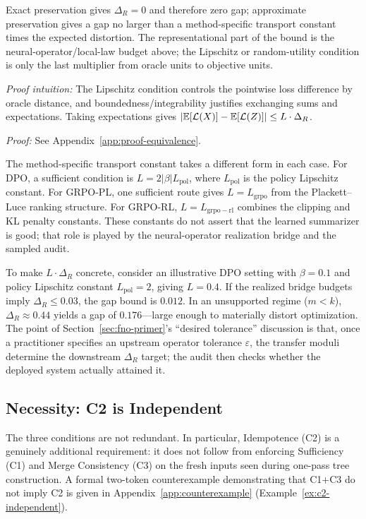 \noindent Exact preservation gives $\Delta_R = 0$ and therefore zero gap; approximate preservation gives a gap no larger than a method-specific transport constant times the expected distortion. The representational part of the bound is the neural-operator/local-law budget above; the Lipschitz or random-utility condition is only the last multiplier from oracle units to objective units.

\noindent\textit{Proof intuition:} The Lipschitz condition controls the pointwise loss difference by oracle distance, and boundedness/integrability justifies exchanging sums and expectations. Taking expectations gives $|\mathbb{E}[\mathcal{L}(X)] - \mathbb{E}[\mathcal{L}(Z)]| \le L \cdot \Delta_R$.

\noindent\textit{Proof:} See Appendix~\ref{app:proof-equivalence}.

The method-specific transport constant takes a different form in each case. For DPO, a sufficient condition is $L = 2|\beta| L_{\mathrm{pol}}$, where $L_{\mathrm{pol}}$ is the policy Lipschitz constant. For GRPO-PL, one sufficient route gives $L = L_{\mathrm{grpo}}$ from the Plackett--Luce ranking structure. For GRPO-RL, $L = L_{\mathrm{grpo-rl}}$ combines the clipping and KL penalty constants. These constants do not assert that the learned summarizer is good; that role is played by the neural-operator realization bridge and the sampled audit.

To make $L \cdot \Delta_R$ concrete, consider an illustrative DPO
setting with $\beta = 0.1$ and policy Lipschitz constant
$L_{\mathrm{pol}} = 2$, giving $L = 0.4$. If the realized bridge
budgets imply $\Delta_R \le 0.03$, the gap bound is $0.012$. In an
unsupported regime ($m < k$), $\Delta_R \approx 0.44$ yields a gap of
$0.176$---large enough to materially distort optimization. The point of
Section~\ref{sec:fno-primer}'s ``desired tolerance'' discussion is that,
once a practitioner specifies an upstream operator tolerance
$\varepsilon$, the transfer moduli determine the downstream
$\Delta_R$ target; the audit then checks whether the deployed system
actually attained it.

\subsection{Necessity: C2 is Independent}

The three conditions are not redundant. In particular, Idempotence (C2) is a genuinely additional requirement: it does not follow from enforcing Sufficiency (C1) and Merge Consistency (C3) on the fresh inputs seen during one-pass tree construction. A formal two-token counterexample demonstrating that C1$+$C3 do not imply C2 is given in Appendix~\ref{app:counterexample} (Example~\ref{ex:c2-independent}).

